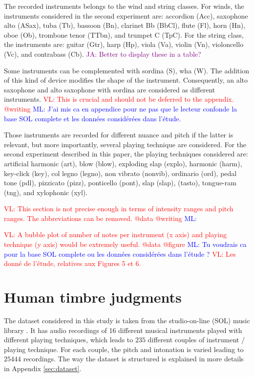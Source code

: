 \documentclass{bmcart}
\newcommand{\ml}[1]{\textcolor{blue}{ML: #1}}
\newcommand{\vl}[1]{\textcolor{red}{VL: #1}}
\newcommand{\ja}[1]{\textcolor{purple}{JA: #1}}
\begin{document}
\begin{backmatter}
The recorded instruments belongs to the wind and string classes.
For winds, the instruments considered in the second experiment are: accordion (Acc), saxophone alto (ASax), tuba (Tb), bassoon (Bn), clarinet Bb (BbCl), flute (Fl), horn (Hn), oboe (Ob), trombone tenor (TTbn), and trumpet C (TpC).
For the string class, the instruments are: guitar (Gtr), harp (Hp), viola (Va), violin (Vn), violoncello (Vc), and contrabass (Cb).
\ja{Better to display these in a table?}

Some instruments can be complemented with sordina (S), wha (W).
The addition of this kind of device modifies the shape of the instrument.
Consequently, an alto saxophone and alto saxophone with sordina are considered as different instruments.
\vl{This is crucial and should not be deferred to the appendix. @writing}
\ml{J'ai mis ca en appendice pour ne pas que le lecteur confonde la base SOL complete et les données considérées dans l'étude.}

Those instruments are recorded for different nuance and pitch if the latter is relevant, but more importantly, several playing technique are considered.
For the second experiment described in this paper, the playing techniques considered are: artificial harmonic (art), blow (blow), exploding slap (explo), harmonic (harm), key-click (key), col legno (legno), non vibrato (nonvib), ordinario (ord), pedal tone (pdl), pizzicato (pizz), ponticello (pont), slap (slap), (tasto), tongue-ram (tng), and xylophonic (xyl).

\vl{This section is not precise enough in terms of intensity ranges and pitch ranges.
The abbreviations can be removed. @data @writing}
\ml{}

\vl{A bubble plot of number of notes per instrument (x axis) and playing technique
(y axis) would be extremely useful. @data @figure}
\ml{Tu voudrais ca pour la base SOL complete ou les données considérées dans l'étude ?}
\vl{Les donn\'{e} de l'\'{e}tude, relatives aux Figures 5 et 6.}

\section*{Human timbre judgments}
\label{sec:subjective}

The dataset considered in this study is taken
from the studio-on-line (SOL) music library  \cite{peeters2000instrument}.
It has audio recordings of 16 different musical instruments played
with different playing techniques,
which leads to $235$ different couples of instrument / playing technique.
For each couple, the pitch and intonation is varied leading to $25444$ recordings.
The way the dataset is structured
is explained in more details in Appendix \ref{sec:dataset}.


\end{backmatter}
\end{document}
